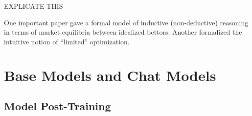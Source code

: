 EXPLICATE THIS

One important paper gave a formal model of inductive (non-deductive) reasoning
in terms of market equilibria between idealized bettors. Another formalized the
intuitive notion of ``limited'' optimization.

\section{Base Models and Chat Models}

\subsection{Model Post-Training}





